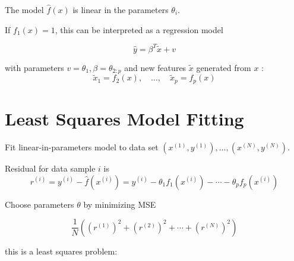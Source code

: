 The model $ \hat{f}(x) $ is linear in the parameters $ \theta_{i} $.

\begin{corollary}
    If $ f_{1}(x)=1 $, this can be interpreted as a regression model

\begin{equation}
\hat{y}=\beta^{T} \tilde{x}+v
\end{equation}

with parameters $ v=\theta_{1}, \beta=\theta_{2: p} $ and new features $ \tilde{x} $ generated from $ x $ :
\begin{equation}
\tilde{x}_{1}=f_{2}(x), \quad \ldots, \quad \tilde{x}_{p}=f_{p}(x)
\end{equation}
\end{corollary}




\section{Least Squares Model Fitting}

\begin{problem}
    Fit linear-in-parameters model to data set $ \left(x^{(1)}, y^{(1)}\right), \ldots,\left(x^{(N)}, y^{(N)}\right) $.
\end{problem}

\begin{theorem}
    Residual for data sample $ i $ is
\begin{equation}
r^{(i)}=y^{(i)}-\hat{f}\left(x^{(i)}\right)=y^{(i)}-\theta_{1} f_{1}\left(x^{(i)}\right)-\cdots-\theta_{p} f_{p}\left(x^{(i)}\right)
\end{equation}
\end{theorem}

\begin{problem}
    Choose parameters $ \theta $ by minimizing MSE

    \begin{equation}
    \frac{1}{N}\left(\left(r^{(1)}\right)^{2}+\left(r^{(2)}\right)^{2}+\cdots+\left(r^{(N)}\right)^{2}\right)
    \end{equation}
\end{problem}

this is a least squares problem: 

